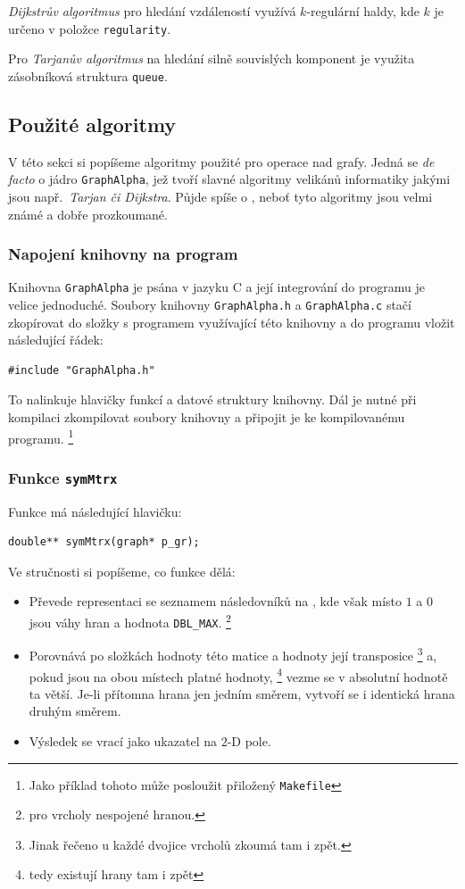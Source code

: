 \documentclass[11pt,a4paper]{article}
\begin{document}
{\sl Dijkstrův algoritmus\/} pro hledání vzdáleností využívá $k$-regulární
haldy, kde $k$ je určeno v položce {\tt regularity}.

Pro {\sl Tarjanův algoritmus\/} na hledání silně souvislých komponent je
využita zásobníková struktura {\tt queue}.

\subsection{Použité algoritmy}
V této sekci si popíšeme algoritmy použité pro operace nad grafy.
Jedná se {\sl de facto\/} o jádro {\tt GraphAlpha}, jež tvoří slavné algoritmy
velikánů informatiky jakými jsou např.\ {\sl Tarjan\/ {\rm či} Dijkstra\/}.
Půjde spíše o , neboť tyto algoritmy jsou velmi známé
a dobře prozkoumané.

\subsubsection{Napojení knihovny na program}
Knihovna {\tt GraphAlpha} je psána v jazyku C a její integrování do programu je
velice jednoduché.
Soubory knihovny {\tt GraphAlpha.h} a {\tt GraphAlpha.c} stačí zkopírovat do
složky s programem využívající této knihovny a do programu vložit následující
řádek:

\begin{verbatim}
#include "GraphAlpha.h"
\end{verbatim}

To nalinkuje hlavičky funkcí a datové struktury knihovny.
Dál je nutné při kompilaci zkompilovat soubory knihovny a připojit je ke
kompilovanému programu.%
\footnote{Jako příklad tohoto může posloužit přiložený \tt Makefile}

\subsubsection{Funkce \tt symMtrx}

Funkce má následující hlavičku:

\begin{verbatim}
double** symMtrx(graph* p_gr);
\end{verbatim}

Ve stručnosti si popíšeme, co funkce dělá:

\renewcommand{\labelitemi}{$\sharp$}

\begin{itemize}
\item Převede representaci se seznamem následovníků na ,
  kde však místo $1$ a $0$ jsou váhy hran a hodnota {\tt DBL\_MAX}.%
  \footnote{pro vrcholy nespojené hranou.}
\item Porovnává po složkách hodnoty této matice a hodnoty její transposice%
\footnote{Jinak řečeno u každé dvojice vrcholů zkoumá tam i zpět.}
a, pokud jsou na obou místech platné hodnoty,%
\footnote{tedy existují hrany tam i zpět}
vezme se v absolutní hodnotě ta větší.
Je-li přítomna hrana jen jedním směrem, vytvoří se i identická hrana druhým
směrem.
\item Výsledek se vrací jako ukazatel na $2$-D pole.
\end{itemize}
\end{document}
